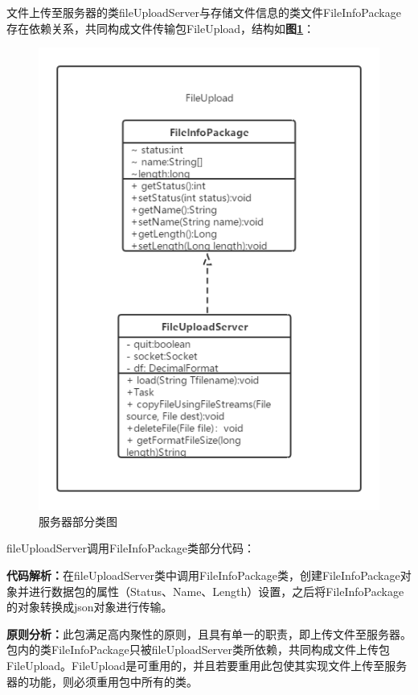 \documentclass[article]{BJTU-thesis}
\begin{document}
文件上传至服务器的类fileUploadServer与存储文件信息的类文件FileInfoPackage存在依赖关系，共同构成文件传输包FileUpload，结构如\textbf{图\ref{fig:fig7}}：

\begin{figure}[!htbp]
	\centering
	\includegraphics[scale=0.6]{img/7.png}
	\caption{服务器部分类图}\label{fig:fig7}
\end{figure}

fileUploadServer调用FileInfoPackage类部分代码：



\textbf{代码解析：}在fileUploadServer类中调用FileInfoPackage类，创建FileInfoPackage对象并进行数据包的属性（Status、Name、Length）设置，之后将FileInfoPackage的对象转换成json对象进行传输。

\textbf{原则分析：}此包满足高内聚性的原则，且具有单一的职责，即上传文件至服务器。包内的类FileInfoPackage只被fileUploadServer类所依赖，共同构成文件上传包FileUpload。FileUpload是可重用的，并且若要重用此包使其实现文件上传至服务器的功能，则必须重用包中所有的类。
\end{document}
